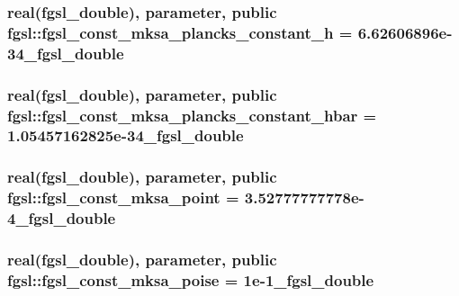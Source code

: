 \hypertarget{classfgsl_a1f1f5a27cac13f7f29c34ccb809e2eae}{
\subsubsection[{fgsl\-\_\-const\-\_\-mksa\-\_\-plancks\-\_\-constant\-\_\-h}]{\setlength{\rightskip}{0pt plus 5cm}real({\bf fgsl\-\_\-double}), parameter, public fgsl\-::fgsl\-\_\-const\-\_\-mksa\-\_\-plancks\-\_\-constant\-\_\-h = 6.\-62606896e-\/34\-\_\-fgsl\-\_\-double}}\label{classfgsl_a1f1f5a27cac13f7f29c34ccb809e2eae}
\hypertarget{classfgsl_a505da32ff79a7c317534298642a2ac3c}{
\subsubsection[{fgsl\-\_\-const\-\_\-mksa\-\_\-plancks\-\_\-constant\-\_\-hbar}]{\setlength{\rightskip}{0pt plus 5cm}real({\bf fgsl\-\_\-double}), parameter, public fgsl\-::fgsl\-\_\-const\-\_\-mksa\-\_\-plancks\-\_\-constant\-\_\-hbar = 1.\-05457162825e-\/34\-\_\-fgsl\-\_\-double}}\label{classfgsl_a505da32ff79a7c317534298642a2ac3c}
\hypertarget{classfgsl_ad8f1c0644b869b25114ce66526bd4a9d}{
\subsubsection[{fgsl\-\_\-const\-\_\-mksa\-\_\-point}]{\setlength{\rightskip}{0pt plus 5cm}real({\bf fgsl\-\_\-double}), parameter, public fgsl\-::fgsl\-\_\-const\-\_\-mksa\-\_\-point = 3.\-52777777778e-\/4\-\_\-fgsl\-\_\-double}}\label{classfgsl_ad8f1c0644b869b25114ce66526bd4a9d}
\hypertarget{classfgsl_a1b18b9e73da6e94185746f50a31ca4c3}{
\subsubsection[{fgsl\-\_\-const\-\_\-mksa\-\_\-poise}]{\setlength{\rightskip}{0pt plus 5cm}real({\bf fgsl\-\_\-double}), parameter, public fgsl\-::fgsl\-\_\-const\-\_\-mksa\-\_\-poise = 1e-\/1\-\_\-fgsl\-\_\-double}}\label{classfgsl_a1b18b9e73da6e94185746f50a31ca4c3}
